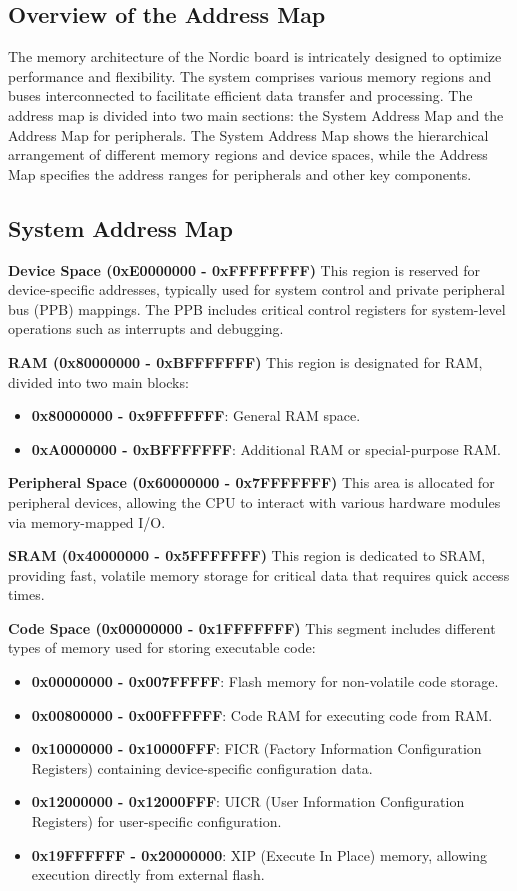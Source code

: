 \documentclass{Configuration_Files/PoliMi3i_thesis}
\begin{document}
\subsection{Overview of the Address Map}
The memory architecture of the Nordic board is intricately designed to optimize performance and flexibility. The system comprises various memory regions and buses interconnected to facilitate efficient data transfer and processing.
The address map is divided into two main sections: the System Address Map and the Address Map for peripherals. The System Address Map shows the hierarchical arrangement of different memory regions and device spaces, while the Address Map specifies the address ranges for peripherals and other key components.

\subsection{System Address Map}

\textbf{Device Space (0xE0000000 - 0xFFFFFFFF)}
This region is reserved for device-specific addresses, typically used for system control and private peripheral bus (PPB) mappings. The PPB includes critical control registers for system-level operations such as interrupts and debugging.

\textbf{RAM (0x80000000 - 0xBFFFFFFF)}
This region is designated for RAM, divided into two main blocks:
\begin{itemize}
    \item \textbf{0x80000000 - 0x9FFFFFFF}: General RAM space.
    \item \textbf{0xA0000000 - 0xBFFFFFFF}: Additional RAM or special-purpose RAM.
\end{itemize}

\textbf{Peripheral Space (0x60000000 - 0x7FFFFFFF)}
This area is allocated for peripheral devices, allowing the CPU to interact with various hardware modules via memory-mapped I/O.

\textbf{SRAM (0x40000000 - 0x5FFFFFFF)}
This region is dedicated to SRAM, providing fast, volatile memory storage for critical data that requires quick access times.

\textbf{Code Space (0x00000000 - 0x1FFFFFFF)}
This segment includes different types of memory used for storing executable code:
\begin{itemize}
    \item \textbf{0x00000000 - 0x007FFFFF}: Flash memory for non-volatile code storage.
    \item \textbf{0x00800000 - 0x00FFFFFF}: Code RAM for executing code from RAM.
    \item \textbf{0x10000000 - 0x10000FFF}: FICR (Factory Information Configuration Registers) containing device-specific configuration data.
    \item \textbf{0x12000000 - 0x12000FFF}: UICR (User Information Configuration Registers) for user-specific configuration.
    \item \textbf{0x19FFFFFF - 0x20000000}: XIP (Execute In Place) memory, allowing execution directly from external flash.
\end{itemize}
\end{document}
